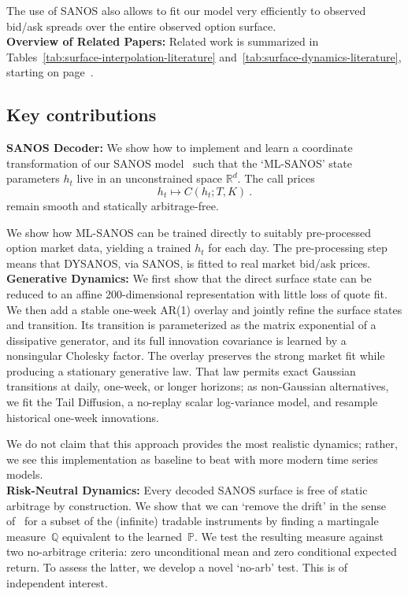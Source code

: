 \documentclass[11pt,a4paper]{article}
\newcommand{\R}{\mathbb{R}}
\newcommand{\Q}{\mathbb{Q}}
\renewcommand{\P}{\mathbb{P}}
\renewcommand{\Q}{\mathbb{Q}}
\begin{document}
The use of SANOS also allows to fit our model very efficiently to observed bid/ask spreads over the entire observed option surface.\\

\noindent
\textbf{Overview of Related Papers:}
Related work is summarized in Tables~\ref{tab:surface-interpolation-literature}
and~\ref{tab:surface-dynamics-literature}, starting on
page~\pageref{tab:surface-interpolation-literature}.

\subsection*{Key contributions}

\noindent
\textbf{SANOS Decoder:}
    We show how to implement and learn a coordinate transformation of
    our SANOS model~\citep{SANOS2026}
    such that the `ML-SANOS' state parameters $h_t$ live in an unconstrained space
    $\R^{d}$.  The call
    prices 
    $$
        h_t \longmapsto C(h_t;T,K)  \ .
    $$    
    remain smooth and statically arbitrage-free.
    
    We show how ML-SANOS can be trained directly to suitably pre-processed 
    option market data, yielding a trained $h_t$ for each day.
    The pre-processing step means that DYSANOS, via SANOS, is fitted to real market bid/ask prices.\\

\noindent
\textbf{Generative Dynamics:}
    We first show that the direct surface state can be reduced to an
    affine 200-dimensional representation with little loss of quote fit.  We
    then add a stable one-week AR(1) overlay and jointly refine the surface
    states and transition.  Its transition is parameterized as the matrix
    exponential of a dissipative generator, and its full innovation
    covariance is learned by a nonsingular Cholesky factor.  The overlay
    preserves the strong market fit while producing a stationary generative
    law.  That law permits exact Gaussian transitions at daily, one-week, or
    longer horizons; as non-Gaussian alternatives, we fit the Tail Diffusion,
    a no-replay scalar log-variance model, and resample historical one-week
    innovations.
    
    We do not
    claim that this approach provides the most realistic dynamics; rather,
    we see this implementation as baseline to beat with more modern
    time series models.\\

    \noindent
\textbf{Risk-Neutral Dynamics:}
Every decoded SANOS surface is free of static arbitrage by construction.
We show that we can `remove the drift' in the sense of~\citet{removedrift} for a subset of the (infinite) tradable instruments
by finding a martingale measure~$\Q$ equivalent to the learned~$\P$.
We test the resulting measure against two no-arbitrage criteria: zero
unconditional mean and zero conditional expected return. To assess the latter, we develop a novel `no-arb' test.
This is of independent interest.
\end{document}
